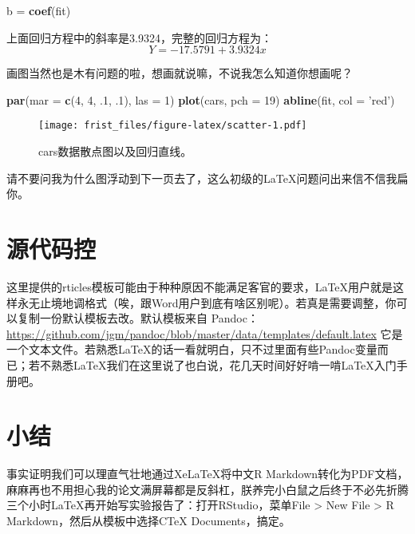 \documentclass[
]{ctexart}
\newenvironment{Shaded}{\begin{snugshade}}{\end{snugshade}}
\newcommand{\DataTypeTok}[1]{\textcolor[rgb]{0.13,0.29,0.53}{#1}}
\newcommand{\DecValTok}[1]{\textcolor[rgb]{0.00,0.00,0.81}{#1}}
\newcommand{\FloatTok}[1]{\textcolor[rgb]{0.00,0.00,0.81}{#1}}
\newcommand{\KeywordTok}[1]{\textcolor[rgb]{0.13,0.29,0.53}{\textbf{#1}}}
\newcommand{\NormalTok}[1]{#1}
\newcommand{\StringTok}[1]{\textcolor[rgb]{0.31,0.60,0.02}{#1}}
\begin{document}
\begin{Shaded}
\begin{Highlighting}[]
\NormalTok{b =}\StringTok{ }\KeywordTok{coef}\NormalTok{(fit)}
\end{Highlighting}
\end{Shaded}

上面回归方程中的斜率是3.9324，完整的回归方程为：\[ Y = -17.5791 + 3.9324x\]

画图当然也是木有问题的啦，想画就说嘛，不说我怎么知道你想画呢？

\begin{Shaded}
\begin{Highlighting}[]
\KeywordTok{par}\NormalTok{(}\DataTypeTok{mar =} \KeywordTok{c}\NormalTok{(}\DecValTok{4}\NormalTok{, }\DecValTok{4}\NormalTok{, }\FloatTok{.1}\NormalTok{, }\FloatTok{.1}\NormalTok{), }\DataTypeTok{las =} \DecValTok{1}\NormalTok{)}
\KeywordTok{plot}\NormalTok{(cars, }\DataTypeTok{pch =} \DecValTok{19}\NormalTok{)}
\KeywordTok{abline}\NormalTok{(fit, }\DataTypeTok{col =} \StringTok{'red'}\NormalTok{)}
\end{Highlighting}
\end{Shaded}

\begin{figure}
\centering
\texttt{[image: frist\_files/figure-latex/scatter-1.pdf]}
\caption{cars数据散点图以及回归直线。}
\end{figure}

请不要问我为什么图浮动到下一页去了，这么初级的LaTeX问题问出来信不信我扁你。

\hypertarget{ux6e90ux4ee3ux7801ux63a7}{%
\section{源代码控}\label{ux6e90ux4ee3ux7801ux63a7}}

这里提供的rticles模板可能由于种种原因不能满足客官的要求，LaTeX用户就是这样永无止境地调格式（唉，跟Word用户到底有啥区别呢）。若真是需要调整，你可以复制一份默认模板去改。默认模板来自
Pandoc：\url{https://github.com/jgm/pandoc/blob/master/data/templates/default.latex}
它是一个文本文件。若熟悉LaTeX的话一看就明白，只不过里面有些Pandoc变量而已；若不熟悉LaTeX我们在这里说了也白说，花几天时间好好啃一啃LaTeX入门手册吧。

\hypertarget{ux5c0fux7ed3}{%
\section{小结}\label{ux5c0fux7ed3}}

事实证明我们可以理直气壮地通过XeLaTeX将中文R
Markdown转化为PDF文档，麻麻再也不用担心我的论文满屏幕都是反斜杠，朕养完小白鼠之后终于不必先折腾三个小时LaTeX再开始写实验报告了：打开RStudio，菜单File
\textgreater{} New File \textgreater{} R Markdown，然后从模板中选择CTeX
Documents，搞定。
\end{document}
